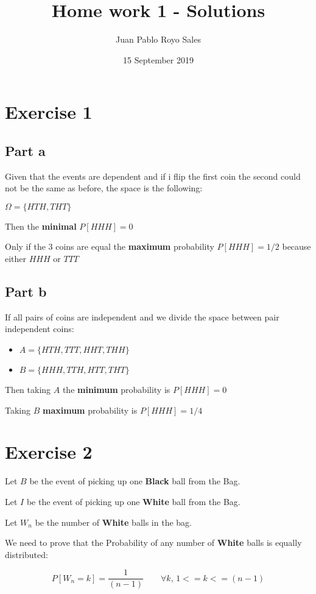 \documentclass[12pt, a4paper]{article}
\title{Home work 1 - Solutions}
\author{Juan Pablo Royo Sales}
\date{15 September 2019}
\begin{document}
\maketitle

\section{Exercise 1}
\subsection{Part a}

Given that the events are dependent and if i flip the first coin the second could not be the same as before, the space is the following:

$\Omega = \{HTH, THT\}$

Then the \textbf{minimal} $P[HHH] = 0$

Only if the 3 coins are equal the \textbf{maximum} probability $P[HHH] = 1/2$ because either $HHH$ or $TTT$

\subsection{Part b}
If all pairs of coins are independent and we divide the space between pair
independent coins:

\begin{itemize}
\item $A = \{HTH,TTT,HHT,THH\}$
\item $B = \{HHH,TTH,HTT,THT\}$
\end{itemize}

Then taking $A$ the \textbf{minimum} probability is $P[HHH] = 0$

Taking $B$ \textbf{maximum} probability is $P[HHH] = 1/4$

\section{Exercise 2}

Let $B$ be the event of picking up one \textbf{Black} ball from the Bag.

Let $I$ be the event of picking up one \textbf{White} ball from the Bag.

Let $W_n$ be the number of \textbf{White} balls in the bag.

We need to prove that the Probability of any number of \textbf{White} balls is equally distributed:

\begin{center}
  \begin{displaymath}
    P[W_n=k] = \frac{1}{(n-1)} \qquad \forall k,\, 1 <= k <= (n - 1)
  \end{displaymath}
\end{center}
\end{document}

